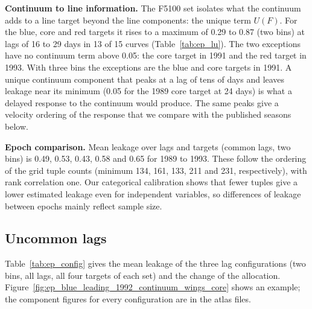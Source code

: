 \documentclass[fleqn,usenatbib]{mnras}
\begin{document}
\textbf{Continuum to line information.} The F5100 set isolates what the continuum
adds to a line target beyond the line components: the unique term $U(F)$. For the
blue, core and red targets it rises to a maximum of 0.29 to 0.87 (two bins) at lags
of 16 to 29 days in 13 of 15 curves (Table~\ref{tab:ep_lu}). The two exceptions
have no continuum term above 0.05: the core target in 1991 and the red target in
1993. With three bins the exceptions are the blue and core targets in 1991. A unique continuum component that
peaks at a lag of tens of days and leaves leakage near its minimum (0.05 for the
1989 core target at 24 days) is what a delayed response to the continuum would
produce. The same peaks give a velocity ordering of the response that we compare
with the published seasons below.

\textbf{Epoch comparison.} Mean leakage over lags and targets (common lags, two bins)
is 0.49, 0.53, 0.43, 0.58 and 0.65 for 1989 to 1993. These follow the ordering of
the grid tuple counts (minimum 134, 161, 133, 211 and 231, respectively), with rank
correlation one. Our categorical calibration shows that fewer tuples give a lower
estimated leakage even for independent variables, so differences of leakage between
epochs mainly reflect sample size.

\subsection{Uncommon lags}

Table~\ref{tab:ep_config} gives the mean leakage of the three lag configurations
(two bins, all lags, all four targets of each set) and the change of the allocation.
Figure~\ref{fig:ep_blue_leading_1992_continuum_wings_core} shows an example; the component
figures for every configuration are in the atlas files.
\end{document}
